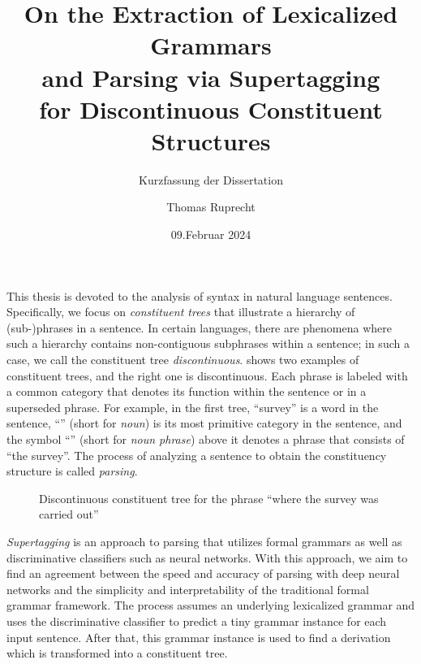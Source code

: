 \documentclass{scrartcl}
\author{Thomas Ruprecht}
\title{
    On the Extraction of Lexicalized Grammars\\and Parsing via Supertagging\\for Discontinuous Constituent Structures
}
\subtitle{Kurzfassung der Dissertation}
\date{09.\@ Februar 2024}
\begin{document}
    \maketitle

    This thesis is devoted to the analysis of syntax in natural language sentences.
    Specifically, we focus on \emph{constituent trees} \citep[Section~3]{Cho56} that illustrate a hierarchy of (sub-)phrases in a sentence.
    In certain languages, there are phenomena where such a hierarchy contains non-contiguous subphrases within a sentence; in such a case, we call the constituent tree \emph{discontinuous}.
     shows two examples of constituent trees, and the right one is discontinuous.
    Each phrase is labeled with a common category that denotes its function within the sentence or in a superseded phrase.
    For example, in the first tree, ``survey'' is a word in the sentence, ``'' (short for \emph{noun}) is its most primitive category in the sentence, and the symbol ``'' (short for \emph{noun phrase}) above it denotes a phrase that consists of ``the survey''.
    The process of analyzing a sentence to obtain the constituency structure is called \emph{parsing}.

    \begin{wrapfigure}{r}{.4\linewidth}
        
        \caption{\label{fig:constituent}
            Discontinuous constituent tree for the phrase ``where the survey was carried out'' }
    \end{wrapfigure}
    \emph{Supertagging} \citep{bangalore1999supertagging} is an approach to parsing that utilizes formal grammars as well as discriminative classifiers such as neural networks.
    With this approach, we aim to find an agreement between the speed and accuracy of parsing with deep neural networks and the simplicity and interpretability of the traditional formal grammar framework.
    The process assumes an underlying lexicalized grammar and uses the discriminative classifier to predict a tiny grammar instance for each input sentence.
    After that, this grammar instance is used to find a derivation which is transformed into a constituent tree.
\end{document}
